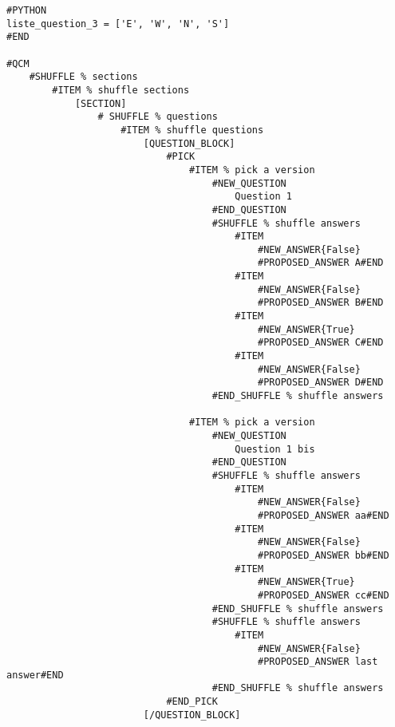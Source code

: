 \documentclass[a4paper,10pt]{article}
\begin{document}
\begin{lstlisting}
#PYTHON
liste_question_3 = ['E', 'W', 'N', 'S']
#END

#QCM
    #SHUFFLE % sections
        #ITEM % shuffle sections
            [SECTION]
                # SHUFFLE % questions
                    #ITEM % shuffle questions
                        [QUESTION_BLOCK]
                            #PICK
                                #ITEM % pick a version
                                    #NEW_QUESTION
                                        Question 1
                                    #END_QUESTION
                                    #SHUFFLE % shuffle answers
                                        #ITEM
                                            #NEW_ANSWER{False}
                                            #PROPOSED_ANSWER A#END
                                        #ITEM
                                            #NEW_ANSWER{False}
                                            #PROPOSED_ANSWER B#END
                                        #ITEM
                                            #NEW_ANSWER{True}
                                            #PROPOSED_ANSWER C#END
                                        #ITEM
                                            #NEW_ANSWER{False}
                                            #PROPOSED_ANSWER D#END
                                    #END_SHUFFLE % shuffle answers

                                #ITEM % pick a version
                                    #NEW_QUESTION
                                        Question 1 bis
                                    #END_QUESTION
                                    #SHUFFLE % shuffle answers
                                        #ITEM
                                            #NEW_ANSWER{False}
                                            #PROPOSED_ANSWER aa#END
                                        #ITEM
                                            #NEW_ANSWER{False}
                                            #PROPOSED_ANSWER bb#END
                                        #ITEM
                                            #NEW_ANSWER{True}
                                            #PROPOSED_ANSWER cc#END
                                    #END_SHUFFLE % shuffle answers
                                    #SHUFFLE % shuffle answers
                                        #ITEM
                                            #NEW_ANSWER{False}
                                            #PROPOSED_ANSWER last answer#END
                                    #END_SHUFFLE % shuffle answers
                            #END_PICK
                        [/QUESTION_BLOCK]


\end{lstlisting}
\end{document}
